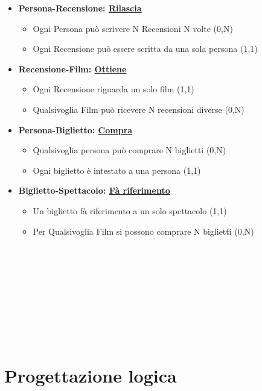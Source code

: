 \documentclass[10pt]{article}
\begin{document}
\begin{itemize}
		\item {\textbf{Persona-Recensione: \underline{Rilascia}}
		    \begin{itemize}
			    \item Ogni Persona può scrivere N Recensioni N volte (0,N)
			    \item Ogni Recensione può essere scritta da una sola persona (1,1)
		    \end{itemize}}  
		    
		\item {\textbf{Recensione-Film: \underline{Ottiene}}
		    \begin{itemize}
			    \item  Ogni Recensione riguarda un solo film (1,1)
			    \item  Qualsivoglia Film può ricevere N recensioni diverse (0,N)
		    \end{itemize}}  
		    
		\item {\textbf{Persona-Biglietto: \underline{Compra}}
		    \begin{itemize}
			    \item  Qualsivoglia persona può comprare N biglietti (0,N)
			    \item  Ogni biglietto è intestato a una persona (1,1)
		    \end{itemize}}  
		
		\item {\textbf{Biglietto-Spettacolo: \underline{Fà riferimento}}
		    \begin{itemize}
			    \item  Un biglietto fà riferimento a un solo spettacolo (1,1)
			    \item  Per Qualsivoglia Film si possono comprare N biglietti (0,N)
		    \end{itemize}}  
		 
    \end{itemize}
	
\\\\\\\\\\\\\\\\
	\section{Progettazione logica}
\end{document}
